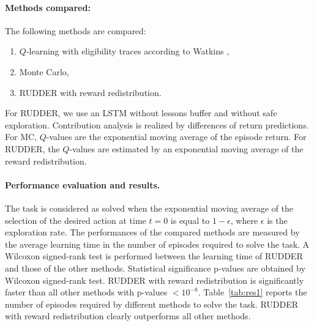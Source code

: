 \documentclass{article}
\begin{document}
\begin{appendices}
\paragraph{Methods compared: }
The following methods are compared:
\begin{enumerate}
    \item $Q$-learning with eligibility traces according to Watkins \cite{Watkins:89}, 
   \item Monte Carlo,
    \item RUDDER with reward redistribution.
\end{enumerate}


For RUDDER, we use an LSTM without lessons buffer 
and without safe exploration. 
Contribution analysis is realized by differences of return predictions.
For MC, $Q$-values are the exponential moving average of the episode return.
For RUDDER, the $Q$-values are estimated by an exponential moving average of the reward redistribution.


\paragraph{Performance evaluation and results.}

The task is considered as solved 
when the exponential moving average of the selection of the desired action 
at time $t = 0$  is equal to $1-\epsilon$, where $\epsilon$ is the exploration rate.
The performances of the compared methods are measured by the average learning time
in the number of episodes required to solve the task.
A Wilcoxon signed-rank test is performed between the learning time of RUDDER 
and those of the other methods.
Statistical significance p-values are obtained by Wilcoxon signed-rank test.
RUDDER with reward redistribution is significantly faster than all other methods with p-values $<10^{-8}$. 
Table~\ref{tab:res1} reports the number of episodes required by different
methods to solve the task.  
RUDDER with reward redistribution clearly outperforms all other methods. 





\end{appendices}
\end{document}

